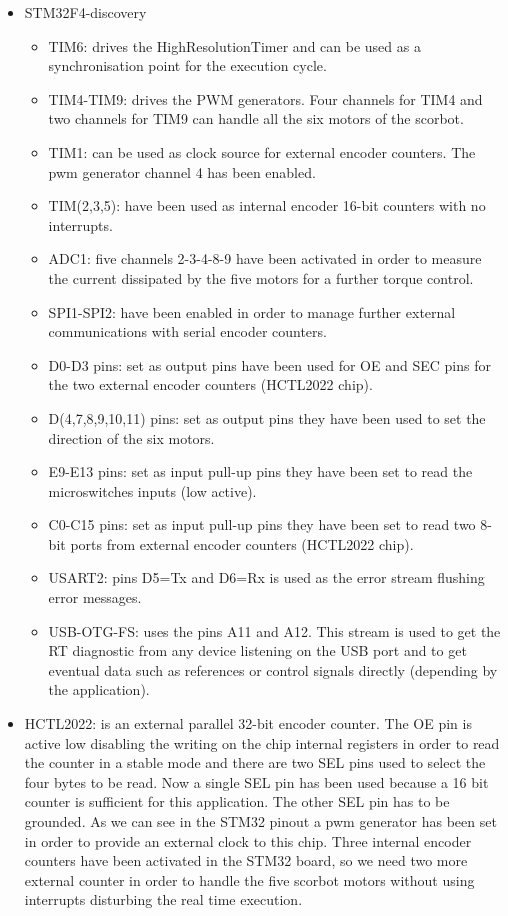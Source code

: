 \begin{itemize}
\item STM32F4-discovery
  \begin{itemize}
  \item TIM6: drives the HighResolutionTimer and can be used as a synchronisation point for the execution cycle.
  \item TIM4-TIM9: drives the PWM generators. Four channels for TIM4 and two channels for TIM9 can handle all the six motors of the scorbot.
  \item TIM1: can be used as clock source for external encoder counters. The pwm generator channel 4 has been enabled.
  \item TIM(2,3,5): have been used as internal encoder 16-bit counters with no interrupts.
  \item ADC1: five channels 2-3-4-8-9 have been activated in order to measure the current dissipated by the five motors for a further torque control.
  \item SPI1-SPI2: have been enabled in order to manage further external communications with serial encoder counters.
  \item D0-D3 pins: set as output pins have been used for OE and SEC pins for the two external encoder counters (HCTL2022 chip).
  \item D(4,7,8,9,10,11) pins: set as output pins they have been used to set the direction of the six motors.
  \item E9-E13 pins: set as input pull-up pins they have been set to read the microswitches inputs (low active).
  \item C0-C15 pins: set as input pull-up pins they have been set to read two 8-bit ports from external encoder counters (HCTL2022 chip).
  \item USART2: pins D5=Tx and D6=Rx is used as the error stream flushing error messages.
  \item USB-OTG-FS: uses the pins A11 and A12. This stream is used to get the RT diagnostic from any device listening on the USB port and to get eventual data such as references or control signals directly (depending by the application).
  \end{itemize}
\item HCTL2022: is an external parallel 32-bit encoder counter. The OE pin is active low disabling the writing on the chip internal registers in order to read the counter in a stable mode and there are two SEL pins used to select the four bytes to be read. Now a single SEL pin has been used because a 16 bit counter is sufficient for this application. The other SEL pin has to be grounded. As we can see in the STM32 pinout a pwm generator has been set in order to provide an external clock to this chip. Three internal encoder counters have been activated in the STM32 board, so we need two more external counter in order to handle the five scorbot motors without using interrupts disturbing the real time execution.


\end{itemize}
